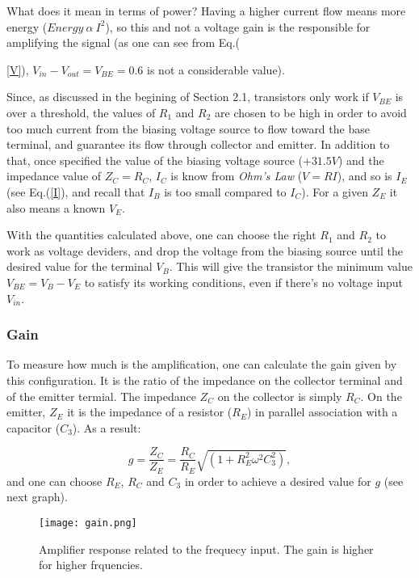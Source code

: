 \documentclass{article}
\begin{document}
What does it mean in terms of power? Having a higher current flow means
more energy ($Energy \ \alpha \ I^{2}$), so this and not a voltage gain is
the responsible for amplifying the signal (as one can see from
Eq.({\ref{V}), $V_{in}-V_{out}=V_{BE}=0.6$ is not a considerable
  value).   

Since, as discussed in the begining of Section 2.1, transistors only work if $V_{BE}$ is
over a threshold, the values of $R_{1}$ and $R_{2}$ are chosen to be high in order to avoid too much current from
the biasing voltage source to flow toward the base terminal, and
guarantee its flow through collector and emitter. In addition to that,
once specified the value of the biasing voltage source ($+31.5V$) and the
impedance value of $Z_{C}=R_{C}$, $I_{C}$ is know from \emph{Ohm's Law}
($V=RI$), and so is $I_{E}$ (see Eq.(\ref{I}), and recall that $I_{B}$
is too small compared to $I_{C}$). For a given $Z_{E}$ it
also means a known $V_{E}$.

With the quantities calculated above, one can choose
the right $R_{1}$ and $R_{2}$ to work as voltage deviders, and drop the
voltage from the biasing source until the desired value for the terminal
$V_{B}$. This will give the transistor the minimum value
$V_{BE}=V_{B}-V_{E}$ to satisfy its working conditions, even if there's no voltage
input $V_{in}$. 

\subsubsection{Gain}

To measure how much is the amplification, one can calculate the gain
given by this configuration. It is the ratio of the impedance on the
collector terminal and of the emitter termial. The impedance $Z_{C}$ on
the collector is simply $R_{C}$. On the emitter, $Z_{E}$ it is the impedance of a
resistor ($R_{E}$) in parallel association with a capacitor
($C_{3}$). As a result:

\begin{equation}
g = \frac{Z_{C}}{Z_{E}}=\frac{R_C}{R_E}\sqrt{(1+R^{2}_{E}\omega^{2}C_{3}^{2})},
\label{g}
\end{equation}
and one can choose $R_{E}$, $R_C$ and $C_{3}$ in order to achieve a 
desired value for $g$ (see next graph).

\begin{figure}[H]
\center
\texttt{[image: gain.png]}
\caption {Amplifier response related to the frequecy input. The gain is
  higher for higher frquencies.} 
\label{gain}
\end{figure}

}
\end{document}
